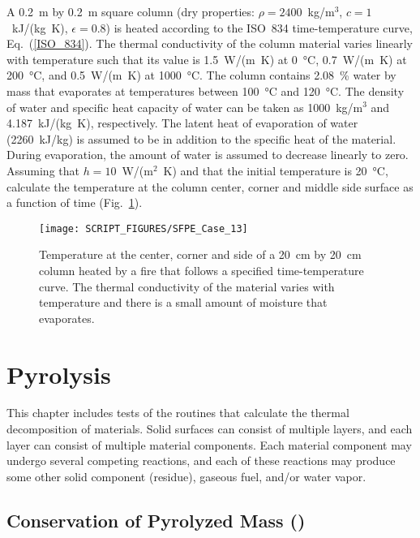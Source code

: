 \documentclass[11pt]{book}
\begin{document}
A 0.2~m by 0.2~m square column (dry properties: $\rho=2400$~kg/m$^3$, $c=1$~kJ/(kg~K), $\epsilon=0.8$) is heated according to the ISO~834 time-temperature curve, Eq.~(\ref{ISO_834}). The thermal conductivity of the column material varies linearly with temperature such that its value is 1.5~W/(m~K) at 0~°C, 0.7~W/(m~K) at 200~°C, and 0.5~W/(m~K) at 1000~°C. The column contains 2.08~\% water by mass that evaporates at temperatures between 100~°C and 120~°C. The density of water and specific heat capacity of water can be taken as 1000~kg/m$^3$ and 4.187~kJ/(kg~K), respectively. The latent heat of evaporation of water (2260~kJ/kg) is assumed to be in addition to the specific heat of the material. During evaporation, the amount of water is assumed to decrease linearly to zero. Assuming that $h=10$~W/(m$^2$~K) and that the initial temperature is 20~°C, calculate the temperature at the column center, corner and middle side surface as a function of time (Fig.~\ref{fig:SFPE_Case_13}).

\begin{figure}[ht]
\centering
\texttt{[image: SCRIPT\_FIGURES/SFPE\_Case\_13]}
\caption[The SFPE heat transfer verification Case 13]{Temperature at the center, corner and side of a 20~cm by 20~cm column heated by a fire that follows a specified time-temperature curve. The thermal conductivity of the material varies with temperature and there is a small amount of moisture that evaporates.}
\label{fig:SFPE_Case_13}
\end{figure}



\chapter{Pyrolysis}

This chapter includes tests of the routines that calculate the thermal decomposition of materials. Solid surfaces can consist of multiple layers, and each layer can consist of multiple material components. Each material component may undergo several competing reactions, and each of these reactions may produce some other solid component (residue), gaseous fuel, and/or water vapor.

\section{Conservation of Pyrolyzed Mass (\texorpdfstring{}{surf\_mass\_conservation})}
\end{document}
